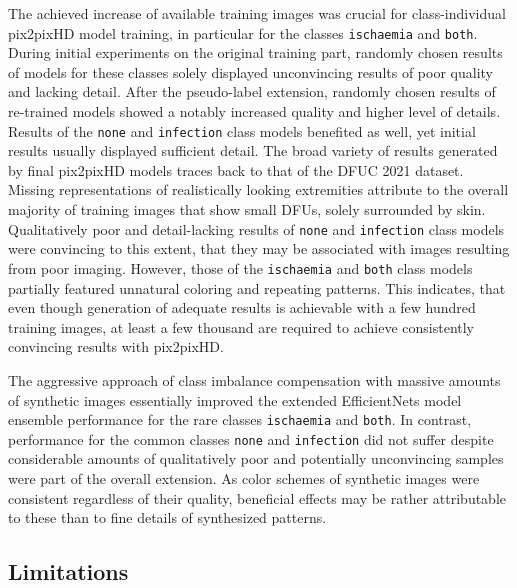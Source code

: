 \documentclass[runningheads]{llncs}
\begin{document}
The achieved increase of available training images was crucial for class-individual pix2pixHD model training, in particular for the classes \texttt{ischaemia} and \texttt{both}. During initial experiments on the original training part, randomly chosen results of models for these classes solely displayed unconvincing results of poor quality and lacking detail. After the pseudo-label extension, randomly chosen results of re-trained models showed a notably increased quality and higher level of details. Results of the \texttt{none} and \texttt{infection} class models benefited as well, yet initial results usually displayed sufficient detail. The broad variety of results generated by final pix2pixHD models traces back to that of the DFUC 2021 dataset. Missing representations of realistically looking extremities attribute to the overall majority of training images that show small DFUs, solely surrounded by skin. Qualitatively poor and detail-lacking results of \texttt{none} and \texttt{infection} class models were convincing to this extent, that they may be associated with images resulting from poor imaging. However, those of the \texttt{ischaemia} and \texttt{both} class models partially featured unnatural coloring and repeating patterns. This indicates, that even though generation of adequate results is achievable with a few hundred training images, at least a few thousand are required to achieve consistently convincing results with pix2pixHD.

The aggressive approach of class imbalance compensation with massive amounts of synthetic images essentially improved the extended EfficientNets model ensemble performance for the rare classes \texttt{ischaemia} and \texttt{both}. In contrast, performance for the common classes \texttt{none} and \texttt{infection} did not suffer despite considerable amounts of qualitatively poor and potentially unconvincing samples were part of the overall extension. As color schemes of synthetic images were consistent regardless of their quality, beneficial effects may be rather attributable to these than to fine details of synthesized patterns.


\subsection{Limitations} %
\end{document}
